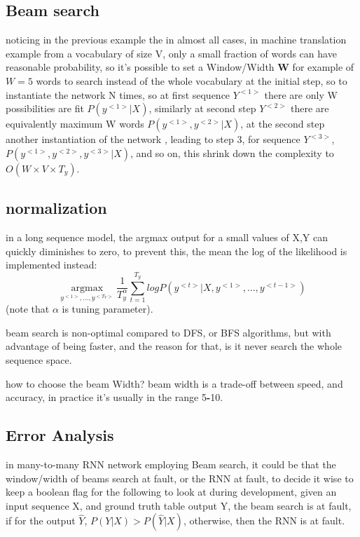 \documentclass[4apaper,12pt]{book}
\begin{document}
\begin{description}
\begin{description}
      \subsection{Beam search}
      \begin{description}
      \item noticing in the previous example the in almost all cases, in machine translation example from a vocabulary of size V, only a small fraction of words can have reasonable probability, so it's possible to set a Window/Width \textbf{W} for example of $W=5$ words to search instead of the whole vocabulary at the initial step, so to instantiate the network N times, so at first sequence $Y^{<1>}$ there are only W possibilities are fit  $P(y^{<1>}|X)$, similarly at second step $Y^{<2>}$ there are equivalently maximum W words $P(y^{<1>},y^{<2>}|X)$, at the second step another instantiation of the network , leading to step 3, for sequence  $Y^{<3>}$, $P(y^{<1>},y^{<2>},y^{<3>}|X)$, and so on, this shrink down the complexity to $O(W\times{V}\times{T_y})$.
        \subsection{normalization}
        \begin{description}
        \item in a long sequence model, the argmax output for a small values of X,Y can quickly diminishes to zero, to prevent this, the mean the log of the likelihood is implemented instead: $$
          \underset{y^{<1>},\dots,y^{<T_Y>}}{\operatorname{argmax}}\frac{1}{T_y^{\alpha}}\sum_{t=1}^{T_y}logP(y^{<t>}|X,y^{<1>},\dots,y^{<t-1>})$$ (note that $\alpha$ is tuning parameter).
        \end{description}
        \item beam search is non-optimal compared to DFS, or BFS algorithms, but with advantage of being faster, and the reason for that, is it never search the whole sequence space.
        \item how to choose the beam Width? beam width is a trade-off between speed, and accuracy, in practice it's usually in the range 5\textbf{-}10.
          \subsection{Error Analysis}
          \begin{description}
          \item in many-to-many RNN network employing Beam search, it could be that the window/width of beams search at fault, or the RNN at fault, to decide it wise to keep a boolean flag for the following to look at during development, given an input sequence X, and ground truth table output Y, the beam search is at fault, if for the output $\hat{Y}$, $P(Y|X)>P(\hat{Y}|X)$, otherwise, then the RNN is at fault.
          \end{description}

\end{description}
\end{description}
\end{description}
\end{document}
